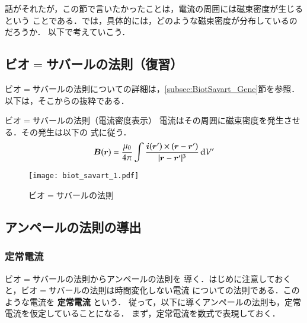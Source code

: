         話がそれたが，この節で言いたかったことは，電流の周囲には磁束密度が生じるという
        ことである．では，具体的には，どのような磁束密度が分布しているのだろうか．
        以下で考えていこう．


    \subsection{ビオ$=$サバールの法則（復習）}
        \begin{mycomment}
            ビオ$=$サバールの法則についての詳細は，\ref{subsec:BiotSavart_Gene}節を参照．
            以下は，そこからの抜粋である．
        \end{mycomment}
            \begin{myshadebox}{ビオ$=$サバールの法則（電流密度表示）}
                電流はその周囲に磁束密度を発生させる．その発生は以下の
                式に従う．
                \begin{align}
                    \boldsymbol{B}(\boldsymbol{r})
                    =\frac{\mu_{0}}{4\pi}
                    \int\frac{\boldsymbol{i}(\boldsymbol{r}')\times
                    (\boldsymbol{r}-\boldsymbol{r}')
                    }{|\boldsymbol{r}-\boldsymbol{r}'|^{3}}\,\mathrm{d} V'
                \end{align}
            \end{myshadebox}
            \begin{figure}[hbt]
                \begin{center}
                    \texttt{[image: biot\_savart\_1.pdf]}
                    \caption{ビオ$=$サバールの法則}
                \end{center}
            \end{figure}

    \subsection{アンペールの法則の導出}
        \subsubsection{定常電流}
            ビオ$=$サバールの法則からアンペールの法則を
            導く．はじめに注意しておくと，ビオ$=$サバールの法則は時間変化しない電流
            についての法則である．このような電流を \textbf{定常電流} という．
            従って，以下に導くアンペールの法則も，定常電流を仮定していることになる．
          まず，定常電流を数式で表現しておく．

